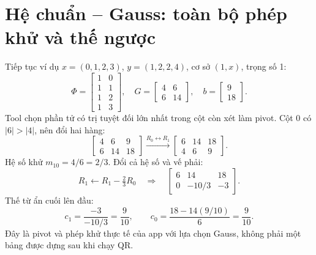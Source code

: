 \section{Hệ chuẩn -- Gauss: toàn bộ phép khử và thế ngược}
\label{sec:ls-normal-gauss}
Tiếp tục ví dụ $x=(0,1,2,3)$, $y=(1,2,2,4)$, cơ sở $(1,x)$, trọng số 1:
\[
\Phi=\begin{bmatrix}1&0\\1&1\\1&2\\1&3\end{bmatrix},\quad
G=\begin{bmatrix}4&6\\6&14\end{bmatrix},\quad b=\begin{bmatrix}9\\18\end{bmatrix}.
\]
Tool chọn phần tử có trị tuyệt đối lớn nhất trong cột còn xét làm pivot. Cột 0 có $|6|>|4|$, nên đổi hai hàng:
\[
\left[\begin{array}{cc|c}4&6&9\\6&14&18\end{array}\right]
\xrightarrow{R_0\leftrightarrow R_1}
\left[\begin{array}{cc|c}6&14&18\\4&6&9\end{array}\right].
\]
Hệ số khử $m_{10}=4/6=2/3$. Đổi cả hệ số và vế phải:
\[
R_1\leftarrow R_1-\tfrac23R_0
\quad\Longrightarrow\quad
\left[\begin{array}{cc|c}6&14&18\\0&-10/3&-3\end{array}\right].
\]
Thế từ ẩn cuối lên đầu:
\[
c_1=\frac{-3}{-10/3}=\frac9{10},\qquad
c_0=\frac{18-14(9/10)}6=\frac9{10}.
\]
Đây là pivot và phép khử thực tế của app với lựa chọn Gauss, không phải một bảng được dựng sau khi chạy QR.

